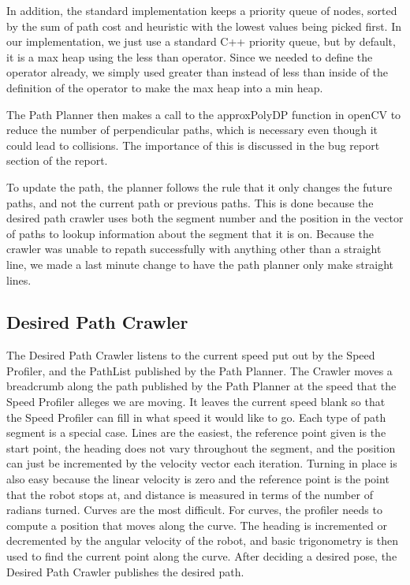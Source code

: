 \documentclass{article}
\begin{document}
In addition, the standard implementation keeps a priority queue of nodes, sorted by the sum of path cost and heuristic with the lowest values being picked first.
In our implementation, we just use a standard C++ priority queue, but by default, it is a max heap using the less than operator.
Since we needed to define the operator already, we simply used greater than instead of less than inside of the definition of the operator to make the max heap into a min heap.

The Path Planner then makes a call to the approxPolyDP function in openCV to reduce the number of perpendicular paths, which is necessary even though it could lead to collisions.
The importance of this is discussed in the bug report section of the report.

To update the path, the planner follows the rule that it only changes the future paths, and not the current path or previous paths. 
This is done because the desired path crawler uses both the segment number and the position in the vector of paths to lookup information about the segment that it is on.  Because the crawler was unable to repath successfully with anything other than a straight line, we made a last minute change to have the path planner only make straight lines.


\subsection{Desired Path Crawler}

The Desired Path Crawler listens to the current speed put out by the Speed Profiler, and the PathList published by the Path Planner.
The Crawler moves a breadcrumb along the path published by the Path Planner at the speed that the Speed Profiler alleges we are moving.
It leaves the current speed blank so that the Speed Profiler can fill in what speed it would like to go.
Each type of path segment is a special case.
Lines are the easiest, the reference point given is the start point, the heading does not vary throughout the segment, and the position can just be incremented by the velocity vector each iteration.
Turning in place is also easy because the linear velocity is zero and the reference point is the point that the robot stops at, and distance is measured in terms of the number of radians turned.
Curves are the most difficult. 
For curves, the profiler needs to compute a position that moves along the curve. 
The heading is incremented or decremented by the angular velocity of the robot, and basic trigonometry is then used to find the current point along the curve.
After deciding a desired pose, the Desired Path Crawler publishes the desired path.
\end{document}
